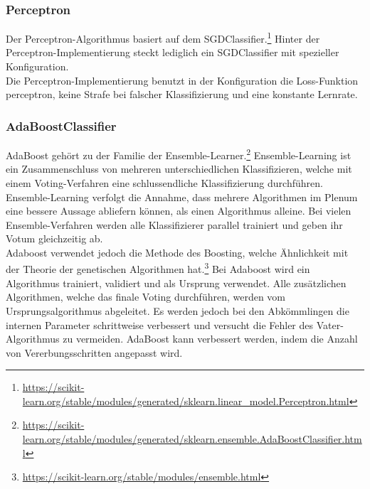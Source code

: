 \subsubsection{Perceptron}
Der Perceptron-Algorithmus basiert auf dem SGDClassifier.\footnote{\url{https://scikit-learn.org/stable/modules/generated/sklearn.linear_model.Perceptron.html}}
Hinter der Perceptron-Implementierung steckt lediglich ein SGDClassifier mit spezieller Konfiguration.\\
Die Perceptron-Implementierung benutzt in der Konfiguration die Loss-Funktion \glqq perceptron\grqq{}, keine Strafe bei falscher Klassifizierung und eine konstante Lernrate.
\subsubsection{AdaBoostClassifier}
AdaBoost gehört zu der Familie der Ensemble-Learner.\footnote{\url{https://scikit-learn.org/stable/modules/generated/sklearn.ensemble.AdaBoostClassifier.html}}
Ensemble-Learning ist ein Zusammenschluss von mehreren unterschiedlichen Klassifizieren, welche mit einem Voting-Verfahren eine schlussendliche Klassifizierung durchführen.
Ensemble-Learning verfolgt die Annahme, dass mehrere Algorithmen im Plenum eine bessere Aussage abliefern können, als einen Algorithmus alleine.
Bei vielen Ensemble-Verfahren werden alle Klassifizierer parallel trainiert und geben ihr Votum gleichzeitig ab.\\
Adaboost verwendet jedoch die Methode des \glqq Boosting\grqq{}, welche Ähnlichkeit mit der Theorie der genetischen Algorithmen hat.\footnote{\url{https://scikit-learn.org/stable/modules/ensemble.html}}
Bei Adaboost wird ein Algorithmus trainiert, validiert und als Ursprung verwendet. Alle zusätzlichen Algorithmen, welche das finale Voting durchführen, werden vom Ursprungsalgorithmus abgeleitet.
Es werden jedoch bei den Abkömmlingen die internen Parameter schrittweise verbessert und versucht die Fehler des \glqq Vater-Algorithmus\grqq{} zu vermeiden.
AdaBoost kann verbessert werden, indem die Anzahl von Vererbungsschritten angepasst wird.
